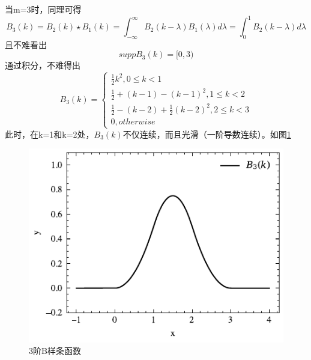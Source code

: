 当m=3时，同理可得
\begin{equation*}
    B_{3}(k)=B_{2}(k)\star B_{1}(k)=\int_{-\infty}^{\infty}B_{2}(k-\lambda)B_{1}(\lambda)d\lambda=
\int_{0}^{1}B_{2}(k-\lambda)d\lambda
\end{equation*}
且不难看出
\begin{equation}
    supp B_3(k)=[0,3)
\end{equation}
通过积分，不难得出
\begin{equation}
B_3(k)=
    \left\{\begin{matrix} 
\frac{1}{2}k^2 ,0\le k<1\\
\frac{1}{2}+(k-1)-(k-1)^2 ,1\le k<2\\
\frac{1}{2}-(k-2)+\frac{1}{2} (k-2)^2 ,2\le k<3\\
0,otherwise
\end{matrix}\right. 
\end{equation}
此时，在k=1和k=2处，$B_3(k)$不仅连续，而且光滑（一阶导数连续）。如图\ref{B3}
\begin{figure}[htbp]
    \centering
    \includegraphics[width=0.76\linewidth]{figures/B-splin/B3.pdf}
    \caption{3阶B样条函数}
    \label{B3}
\end{figure}

